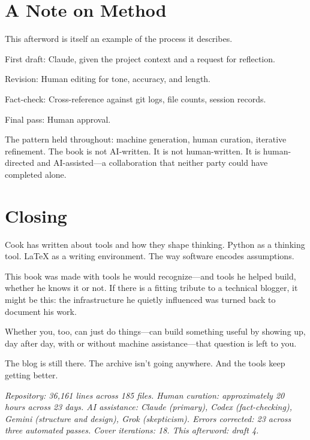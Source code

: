 \section*{A Note on Method}

This afterword is itself an example of the process it describes.

First draft: Claude, given the project context and a request for reflection.

Revision: Human editing for tone, accuracy, and length.

Fact-check: Cross-reference against git logs, file counts, session records.

Final pass: Human approval.

The pattern held throughout: machine generation, human curation, iterative refinement. The book is not AI-written. It is not human-written. It is human-directed and AI-assisted---a collaboration that neither party could have completed alone.

\bigskip

\section*{Closing}

Cook has written about tools and how they shape thinking. Python as a thinking tool. LaTeX as a writing environment. The way software encodes assumptions.

This book was made with tools he would recognize---and tools he helped build, whether he knows it or not. If there is a fitting tribute to a technical blogger, it might be this: the infrastructure he quietly influenced was turned back to document his work.

Whether you, too, can just do things---can build something useful by showing up, day after day, with or without machine assistance---that question is left to you.

The blog is still there. The archive isn't going anywhere. And the tools keep getting better.

\bigskip

\textit{Repository: 36,161 lines across 185 files. Human curation: approximately 20 hours across 23 days. AI assistance: Claude (primary), Codex (fact-checking), Gemini (structure and design), Grok (skepticism). Errors corrected: 23 across three automated passes. Cover iterations: 18. This afterword: draft 4.}

